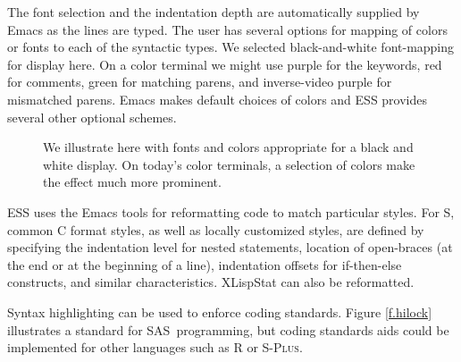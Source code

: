 \documentclass{article}
\newcommand*{\SAS}{\textsc{SAS}}
\newcommand*{\Splus}{\textsc{S-Plus}}
\newcommand{\stexttt}[1]{{\small\texttt{#1}}}
\begin{document}
The font selection and the indentation depth are automatically
supplied by Emacs as the lines are typed.  The user has several
options for mapping of colors or fonts to each of the syntactic types.
We selected black-and-white font-mapping for display here.  On a color
terminal we might use purple for the keywords, red for comments, green
for matching parens, and inverse-video purple for mismatched parens.
Emacs makes default choices of colors and ESS provides several other
optional schemes.

\begin{figure}[tbp]%
  \caption{We illustrate here with fonts and colors appropriate for a
    black and white display.  On
    today's color terminals,        a selection of colors make the effect
    much more prominent.
    }
  \label{f.font}
\end{figure}

ESS uses the Emacs tools for reformatting code to match particular
styles.  For S, common C format styles, as well as locally customized
styles, are defined by specifying the indentation level for nested
statements, location of open-braces (at the end or at the beginning of
a line), indentation offsets for if-then-else constructs, and similar
characteristics.  XLispStat can also be reformatted.

Syntax highlighting can be used to enforce coding standards.  Figure
\ref{f.hilock} illustrates a standard for \SAS\ programming, but coding
standards aids could be implemented for other languages such as R or \Splus.

\end{document}
